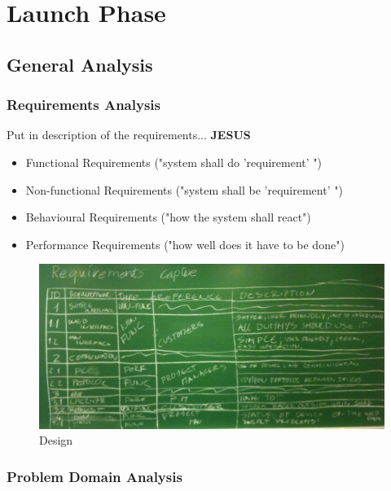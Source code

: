 \newpage
\section{Launch Phase}
\subsection{General Analysis}
	\subsubsection{Requirements	 Analysis}
		Put in description of the requirements... \textbf{JESUS}
		\begin{itemize}
			\item Functional Requirements ("system shall do 'requirement' ")
			\item Non-functional Requirements ("system shall be 'requirement' ")
			\item Behavioural Requirements ("how the system shall react")
			\item Performance Requirements ("how well does it have to be done")
		\end{itemize}
		\begin{figure}[h!]		%
			\begin{centering}
				 \includegraphics[width=1.0\textwidth]{images/requirement_capture.JPG}
		 		\caption{Design}
			 \end{centering}
		\end{figure}
	\subsubsection{Problem Domain Analysis}
